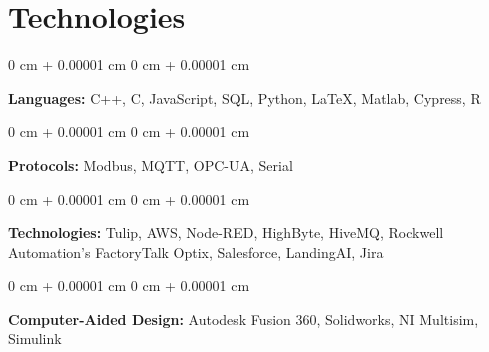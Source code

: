 \documentclass[10pt, letterpaper]{article}
\newenvironment{onecolentry}{
    \begin{adjustwidth}{
        0 cm + 0.00001 cm
    }{
        0 cm + 0.00001 cm
    }
}{
    \end{adjustwidth}
} %
\begin{document}
    
    \section{Technologies}



        
        \begin{onecolentry}
            \textbf{Languages:} C++, C, JavaScript, SQL, Python, \LaTeX, Matlab, Cypress, R
        \end{onecolentry}

        \vspace{0.2 cm}
        
        \begin{onecolentry}
            \textbf{Protocols:} Modbus, MQTT, OPC-UA, Serial
        \end{onecolentry}

        \vspace{0.2 cm}
        
        \begin{onecolentry}
            \textbf{Technologies:} Tulip, AWS, Node-RED, HighByte, HiveMQ, Rockwell Automation's FactoryTalk Optix, Salesforce, LandingAI, Jira
        \end{onecolentry}
        
        \vspace{0.2 cm}
        
        \begin{onecolentry}
            \textbf{Computer-Aided Design:} Autodesk Fusion 360, Solidworks, NI Multisim, Simulink
        \end{onecolentry}
\end{document}
